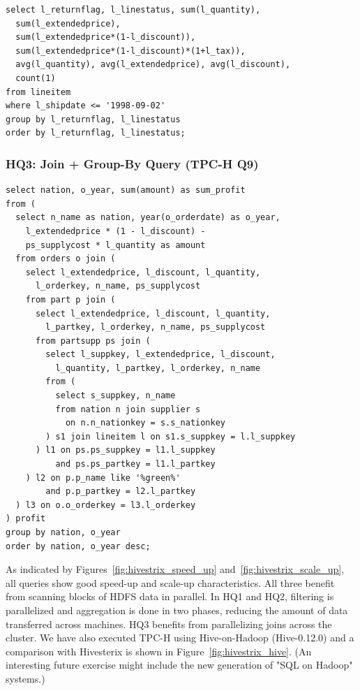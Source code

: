 \begin{lstlisting}
select l_returnflag, l_linestatus, sum(l_quantity), 
  sum(l_extendedprice), 
  sum(l_extendedprice*(1-l_discount)),     
  sum(l_extendedprice*(1-l_discount)*(1+l_tax)), 
  avg(l_quantity), avg(l_extendedprice), avg(l_discount), 
  count(1) 
from lineitem 
where l_shipdate <= '1998-09-02' 
group by l_returnflag, l_linestatus 
order by l_returnflag, l_linestatus;
\end{lstlisting}

\subsubsection*{HQ3: Join + Group-By Query (TPC-H Q9)}

\begin{lstlisting}
select nation, o_year, sum(amount) as sum_profit
from (
  select n_name as nation, year(o_orderdate) as o_year, 
    l_extendedprice * (1 - l_discount) -  
    ps_supplycost * l_quantity as amount
  from orders o join (
    select l_extendedprice, l_discount, l_quantity, 
      l_orderkey, n_name, ps_supplycost 
    from part p join (
      select l_extendedprice, l_discount, l_quantity, 
        l_partkey, l_orderkey, n_name, ps_supplycost 
      from partsupp ps join (
        select l_suppkey, l_extendedprice, l_discount, 
          l_quantity, l_partkey, l_orderkey, n_name 
        from (
          select s_suppkey, n_name 
          from nation n join supplier s 
            on n.n_nationkey = s.s_nationkey
        ) s1 join lineitem l on s1.s_suppkey = l.l_suppkey
      ) l1 on ps.ps_suppkey = l1.l_suppkey 
          and ps.ps_partkey = l1.l_partkey
    ) l2 on p.p_name like '%green%' 
        and p.p_partkey = l2.l_partkey
  ) l3 on o.o_orderkey = l3.l_orderkey
) profit
group by nation, o_year
order by nation, o_year desc;
\end{lstlisting}

As indicated by Figures~\ref{fig:hivestrix_speed_up} and~\ref{fig:hivestrix_scale_up}, all queries show good speed-up and scale-up characteristics. All three benefit from scanning blocks of HDFS data in parallel. In HQ1 and HQ2, filtering is parallelized and aggregation is done in two phases, reducing the amount of data transferred across machines. HQ3 benefits from parallelizing joins across the cluster.
We have also executed TPC-H using Hive-on-Hadoop (Hive-0.12.0) and
a comparison with Hivesterix is shown in 
Figure~\ref{fig:hivestrix_hive}. (An interesting future exercise might include the new generation of "SQL on Hadoop" systems.)

